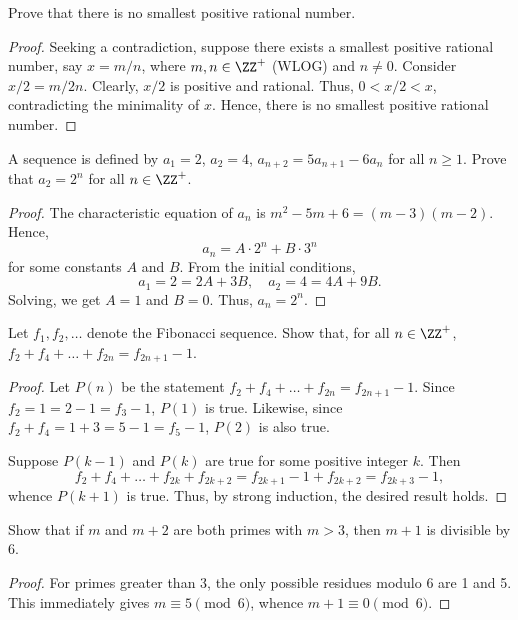 \begin{problem}
    Prove that there is no smallest positive rational number.
\end{problem}
\begin{proof}
    Seeking a contradiction, suppose there exists a smallest positive rational number, say $x = m/n$, where $m, n \in \ZZ^+$ (WLOG) and $n \neq 0$. Consider $x/2 = m/2n$. Clearly, $x/2$ is positive and rational. Thus, $0 < x/2 < x$, contradicting the minimality of $x$. Hence, there is no smallest positive rational number.
\end{proof}

\begin{problem}
    A sequence is defined by $a_1 = 2$, $a_2 = 4$, $a_{n+2} = 5a_{n+1} - 6a_n$ for all $n \geq 1$. Prove that $a_2 = 2^n$ for all $n \in \ZZ^+$.
\end{problem}
\begin{proof}
    The characteristic equation of $a_n$ is $m^2 - 5m + 6 = (m-3)(m-2)$. Hence, \[a_n = A \cdot 2^n + B \cdot 3^n\] for some constants $A$ and $B$. From the initial conditions, \[a_1 = 2 = 2A + 3B, \quad a_2 = 4 = 4A + 9B.\] Solving, we get $A = 1$ and $B = 0$. Thus, $a_n = 2^n$.
\end{proof}

\begin{problem}
    Let $f_1, f_2, \dots$ denote the Fibonacci sequence. Show that, for all $n \in \ZZ^+$, $f_2 + f_4 + \dots + f_{2n} = f_{2n+1} - 1$.
\end{problem}
\begin{proof}
    Let $P(n)$ be the statement $f_2 + f_4 + \dots + f_{2n} = f_{2n+1} - 1$. Since $f_2 = 1 = 2 - 1 = f_3 - 1$, $P(1)$ is true. Likewise, since $f_2 + f_4 = 1 + 3 = 5 - 1 = f_5 - 1$, $P(2)$ is also true.

    Suppose $P(k-1)$ and $P(k)$ are true for some positive integer $k$. Then \[f_2 + f_4 + \dots + f_{2k} + f_{2k+2} = f_{2k+1} - 1 + f_{2k+2} = f_{2k+3} - 1,\] whence $P(k+1)$ is true. Thus, by strong induction, the desired result holds.
\end{proof}

\begin{problem}
    Show that if $m$ and $m+2$ are both primes with $m > 3$, then $m+1$ is divisible by 6.
\end{problem}
\begin{proof}
    For primes greater than 3, the only possible residues modulo 6 are 1 and 5. This immediately gives $m \equiv 5 \pmod{6}$, whence $m + 1 \equiv 0 \pmod{6}$.
\end{proof}

